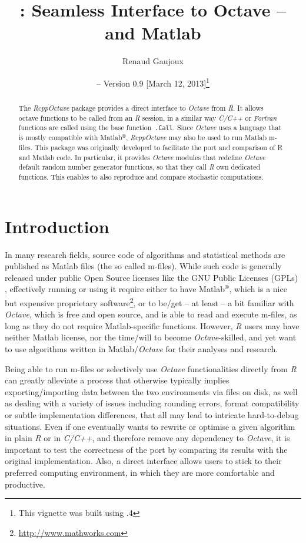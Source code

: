 \documentclass[english,10pt,a4paper]{article}\usepackage{graphicx, color}
\author{Renaud Gaujoux}
\title{\pkgname{RcppOctave}: Seamless Interface to Octave -- and Matlab}
\date{\Rpkg{RcppOctave} -- Version 0.9
[March 12, 2013]\footnote{This vignette was built using \octave
3.6.4}}
\newcommand{\matlab}{Matlab$^\circledR$\xspace}
\let\proglang=\textit
\let\code=\texttt
\newcommand{\pkgname}[1]{\textit{#1}\xspace}
\newcommand{\Rpkg}[1]{\pkgname{#1} package\xspace}
\newcommand{\R}{\proglang{R}\xspace}
\newcommand{\octave}{\proglang{Octave}\xspace}
\begin{document}
\maketitle

\begin{abstract}
The \Rpkg{RcppOctave} provides a direct interface to \octave from
\R.
It allows \\octave functions to be called from an \R session,
in a similar way \proglang{C/C++} or \proglang{Fortran} functions are called using the base function~\code{.Call}.
Since \octave uses a language that is mostly compatible with \matlab,
\pkgname{RcppOctave} may also be used to run Matlab m-files.
This package was originally developed to facilitate the port and comparison of R
and Matlab code.
In particular, it provides \octave modules that redefine
\octave default random number generator functions, so that they call
\proglang{R} own dedicated functions.
This enables to also reproduce and compare stochastic computations.
\end{abstract}

\noindent\hrulefill
\tableofcontents
\noindent\hrulefill

\section{Introduction}

In many research fields, source code of algorithms and statistical methods are
published as Matlab files (the so called m-files).
While such code is generally released under public Open Source licenses like the
GNU Public Licenses (GPLs) \cite{gnuGPL}, effectively running or using it
require either to have \matlab, which is a nice but expensive proprietary
software\footnote{\url{http://www.mathworks.com}}, or to be/get -- at least -- a bit familiar with \octave \cite{Eaton2002}, which is free and open source, and is able to read and execute m-files, as long as they do not require Matlab-specific functions.
However, \proglang{R} users may have neither Matlab license, nor the
time/will to become \octave-skilled, and yet want to use algorithms written in
Matlab/\octave for their analyses and research.

Being able to run m-files or selectively use \octave functionalities
directly from \proglang{R} can greatly alleviate a process that otherwise
typically implies exporting/importing data between the two environments via
files on disk, as well as dealing with a variety of issues including
rounding errors, format compatibility or subtle implementation differences,
that all may lead to intricate hard-to-debug situations.
Even if one eventually wants to rewrite or optimise a given algorithm in plain
\proglang{R} or in \proglang{C/C++}, and therefore remove any dependency to
\octave, it is important to test the correctness of the port by
comparing its results with the original implementation.
Also, a direct interface allows users to stick to their preferred computing
environment, in which they are more comfortable and productive.
\end{document}
